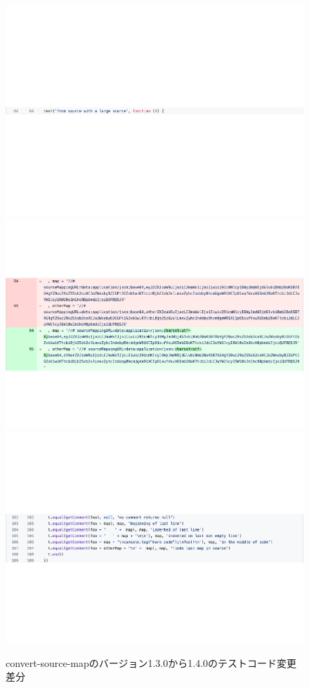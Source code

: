 \documentclass[11pt,dvipdfmx]{jreport}
\begin{document}
\begin{figure}[t]
  \centering
  \includegraphics[width=1.0\linewidth]{fig/rq2/source-map-1.pdf}
  \includegraphics[width=1.0\linewidth]{fig/rq2/source-map-2.pdf}
  \includegraphics[width=1.0\linewidth]{fig/rq2/source-map-3.pdf}
  \caption{convert-source-mapのバージョン1.3.0から1.4.0のテストコード変更差分}
  \label{fig:rq2.convert-source-map}
\end{figure}
\end{document}
